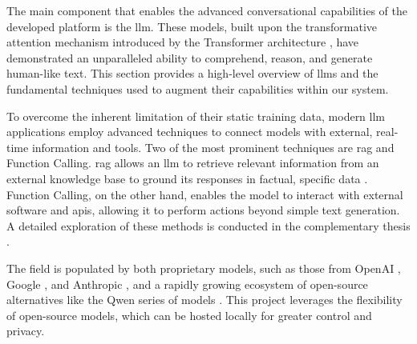 The main component that enables the advanced conversational capabilities of the developed platform is the \acl{llm}. These models, built upon the transformative attention mechanism introduced by the Transformer architecture \cite{SOTA-TRANSFORMERS}, have demonstrated an unparalleled ability to comprehend, reason, and generate human-like text. This section provides a high-level overview of \acp{llm} and the fundamental techniques used to augment their capabilities within our system.

To overcome the inherent limitation of their static training data, modern \ac{llm} applications employ advanced techniques to connect models with external, real-time information and tools. Two of the most prominent techniques are \ac{rag} and Function Calling. \ac{rag} allows an \ac{llm} to retrieve relevant information from an external knowledge base to ground its responses in factual, specific data \cite{SOTA-RAG-SURVEY}. Function Calling, on the other hand, enables the model to interact with external software and \acp{api}, allowing it to perform actions beyond simple text generation. A detailed exploration of these methods is conducted in the complementary thesis \cite{MUI2ICSI_THESIS}.

The field is populated by both proprietary models, such as those from OpenAI \cite{CHATGPT}, Google \cite{GEMINI}, and Anthropic \cite{CLAUDE}, and a rapidly growing ecosystem of open-source alternatives like the Qwen series of models \cite{QWEN}. This project leverages the flexibility of open-source models, which can be hosted locally for greater control and privacy.